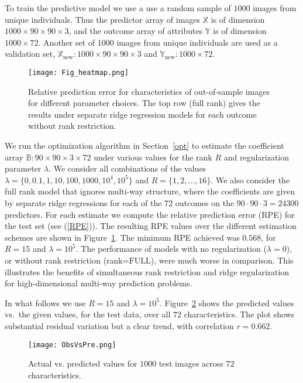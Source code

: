\documentclass[12pt]{article}
\def\XX{\mathbb{X}}
\def\YY{\mathbb{Y}}
\def\BB{\mathbb{B}}
\def\new{\mbox{new}}
\begin{document}
To train the predictive model we use a use a random sample of $1000$ images from unique individuals.  Thus the predictor array of images $\XX$ is of dimension $1000 \times 90 \times 90 \times 3$, and the outcome array of attributes $\YY$ is of dimension $1000 \times 72$.  Another set of $1000$ images from unique individuals are used as a validation set, $\XX_{\new}: 1000 \times 90 \times 90 \times 3$ and $\YY_{\new}: 1000 \times 72$.


\begin{figure}[H]
\centering
\texttt{[image: Fig\_heatmap.png]}
\caption{\label{fig:heatmap} Relative prediction error for characteristics of out-of-sample images for different parameter choices.  The top row (full rank) gives the results under separate ridge regression models for each outcome without rank restriction.}
\end{figure}

We run the optimization algorithm in Section~\ref{opt} to estimate the coefficient array $\BB: 90 \times 90 \times 3 \times 72$ under various values for the rank $R$ and regularization parameter $\lambda$.  We consider all combinations of the values $\lambda=\{0,0.1,1,10,100,1000,10^4,10^5\}$ and $R=\{1,2,\hdots,16\}$.  We also consider the full rank model that ignores multi-way structure, where the coefficients are given by separate ridge regressions for each of the $72$ outcomes on the $90 \cdot 90 \cdot 3 = 24300$ predictors.  For each estimate we compute the relative prediction error (RPE) for the test set (see (\ref{RPE})).  The resulting RPE values over the different estimation schemes are shown in Figure~\ref{fig:heatmap}.  The minimum RPE achieved was $0.568$,  for $R=15$ and $\lambda=10^5$.  The performance of models with no regularization ($\lambda=0$), or without rank restriction (rank=$\mbox{FULL}$), were much worse in comparison.  This illustrates the benefits of simultaneous rank restriction and ridge regularization for high-dimensional multi-way prediction problems.           


In what follows we use $R=15$ and $\lambda=10^5$.  Figure~\ref{fig:scatter} shows the predicted values vs.\ the given values, for the test data, over all $72$ characteristics.  The plot shows substantial residual variation but a clear trend, with correlation $r=0.662$.  %

\begin{figure}[H]
\centering
\texttt{[image: ObsVsPre.png]}
\caption{\label{fig:scatter} Actual vs. predicted values for $1000$ test images across $72$ characteristics.}
\end{figure}
\end{document}
